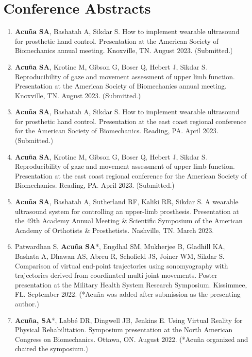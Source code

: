 \documentclass[letterpaper, 10pt]{article}
\begin{document}
\section{Conference Abstracts}
\begin{enumerate}
    \item \textbf{Acuña SA}, Bashatah A, Sikdar S. How to implement wearable ultrasound for prosthetic hand control. Presentation at the American Society of Biomechanics annual meeting. Knoxville, TN. August 2023. (Submitted.)
     \item \textbf{Acuña SA}, Krotine M, Gibson G, Boser Q, Hebert J, Sikdar S. Reproducibility of gaze and movement assessment of upper limb function. Presentation at the American Society of Biomechanics annual meeting. Knoxville, TN. August 2023. (Submitted.)
    \item \textbf{Acuña SA}, Bashatah A, Sikdar S. How to implement wearable ultrasound for prosthetic hand control. Presentation at the east coast regional conference for the American Society of Biomechanics. Reading, PA. April 2023. (Submitted.)
     \item \textbf{Acuña SA}, Krotine M, Gibson G, Boser Q, Hebert J, Sikdar S. Reproducibility of gaze and movement assessment of upper limb function. Presentation at the east coast regional conference for the American Society of Biomechanics. Reading, PA. April 2023. (Submitted.)
    \item \textbf{Acuña SA}, Bashatah A, Sutherland RF, Kaliki RR, Sikdar S. A wearable ultrasound system for controlling an upper-limb prosthesis. Presentation at the 49th Academy Annual Meeting \& Scientiﬁc Symposium of the American Academy of Orthotists \& Prosthetists. Nashville, TN. March 2023.
    \item Patwardhan S, \textbf{Acuña SA}*, Engdhal SM, Mukherjee B, Gladhill KA, Bashata A, Dhawan AS, Abreu R, Schofield JS, Joiner WM,  Sikdar S. Comparison of virtual end-point trajectories using sonomyography with trajectories derived from coordinated multi-joint movements. Poster presentation at the Military Health System Research Symposium. Kissimmee, FL. September 2022. (*Acuña was added after submission as the presenting author.)
    \item \textbf{Acuña, SA}*, Labbé DR, Dingwell JB, Jenkins E. Using Virtual Reality for Physical Rehabilitation. Symposium presentation at the North American Congress on Biomechanics. Ottawa, ON. August 2022. (*Acuña organized and chaired the symposium.)

\end{enumerate}
\end{document}
